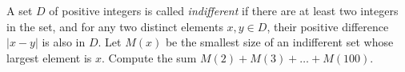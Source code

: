 A set $D$ of positive integers is called \emph{indifferent} if there are at least two integers in the set, and for any two distinct elements $x,y\in D$, their positive difference $|x-y|$ is also in $D$. Let $M(x)$ be the smallest size of an indifferent set whose largest element is $x$. Compute the sum $M(2)+M(3)+\dots+M(100)$.
